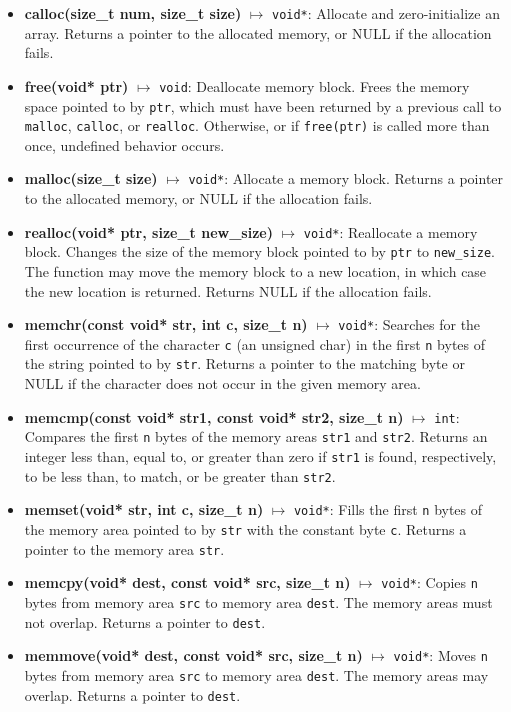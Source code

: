 \documentclass{report}
\begin{document}
    \pagebreak \bigbreak \noindent 
    \bigbreak \noindent 
    \begin{itemize}
        \item \textbf{calloc(size\_t num, size\_t size)} $\mapsto$ \texttt{void*}: Allocate and zero-initialize an array. Returns a pointer to the allocated memory, or NULL if the allocation fails.
        \item \textbf{free(void* ptr)} $\mapsto$ \texttt{void}: Deallocate memory block. Frees the memory space pointed to by \texttt{ptr}, which must have been returned by a previous call to \texttt{malloc}, \texttt{calloc}, or \texttt{realloc}. Otherwise, or if \texttt{free(ptr)} is called more than once, undefined behavior occurs.
        \item \textbf{malloc(size\_t size)} $\mapsto$ \texttt{void*}: Allocate a memory block. Returns a pointer to the allocated memory, or NULL if the allocation fails.
        \item \textbf{realloc(void* ptr, size\_t new\_size)} $\mapsto$ \texttt{void*}: Reallocate a memory block. Changes the size of the memory block pointed to by \texttt{ptr} to \texttt{new\_size}. The function may move the memory block to a new location, in which case the new location is returned. Returns NULL if the allocation fails.
         \item \textbf{memchr(const void* str, int c, size\_t n)} $\mapsto$ \texttt{void*}: Searches for the first occurrence of the character \texttt{c} (an unsigned char) in the first \texttt{n} bytes of the string pointed to by \texttt{str}. Returns a pointer to the matching byte or NULL if the character does not occur in the given memory area.
        \item \textbf{memcmp(const void* str1, const void* str2, size\_t n)} $\mapsto$ \texttt{int}: Compares the first \texttt{n} bytes of the memory areas \texttt{str1} and \texttt{str2}. Returns an integer less than, equal to, or greater than zero if \texttt{str1} is found, respectively, to be less than, to match, or be greater than \texttt{str2}.
        \item \textbf{memset(void* str, int c, size\_t n)} $\mapsto$ \texttt{void*}: Fills the first \texttt{n} bytes of the memory area pointed to by \texttt{str} with the constant byte \texttt{c}. Returns a pointer to the memory area \texttt{str}.
        \item \textbf{memcpy(void* dest, const void* src, size\_t n)} $\mapsto$ \texttt{void*}: Copies \texttt{n} bytes from memory area \texttt{src} to memory area \texttt{dest}. The memory areas must not overlap. Returns a pointer to \texttt{dest}.
        \item \textbf{memmove(void* dest, const void* src, size\_t n)} $\mapsto$ \texttt{void*}: Moves \texttt{n} bytes from memory area \texttt{src} to memory area \texttt{dest}. The memory areas may overlap. Returns a pointer to \texttt{dest}.
    \end{itemize}





%
%
%     

%
%
%

    
\end{document}
